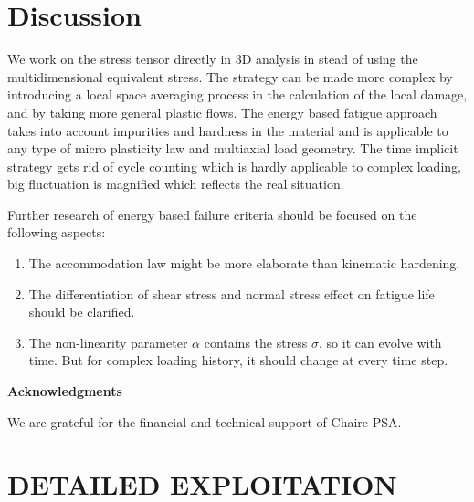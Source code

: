 \documentclass[3p,times,number,review]{elsarticle}
\begin{document}
\clearpage
\section{Discussion}
We work on the stress tensor directly in 3D analysis in stead of using the multidimensional equivalent stress.
The strategy can be made more complex by introducing a local space averaging process in the calculation of the local damage, and by taking more general plastic flows. The energy based fatigue approach takes into account impurities and hardness in the material and is applicable to any type of micro plasticity law and multiaxial load geometry. The time implicit strategy gets rid of cycle counting which is hardly applicable to complex loading, big fluctuation is magnified which reflects the real situation.

Further research of energy based failure criteria should be focused on the following aspects:
\begin{enumerate}
\item The accommodation law might be more elaborate than kinematic hardening.

\vspace{6pt}
\item The differentiation of shear stress and normal stress effect on fatigue life should be clarified.

\vspace{6pt}
\item The non-linearity parameter $\alpha$ contains the stress $\sigma$, so it can evolve with time. But for complex loading history, it should change at every time step.

\end{enumerate}

\vspace{6pt}
\noindent
\textbf{Acknowledgments}

\vspace{6pt}
We are grateful for the financial and technical support of Chaire PSA.






\clearpage
\appendix
\appendixpage
{}
	\section{DETAILED EXPLOITATION}
	
	
\end{document}
